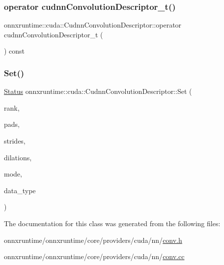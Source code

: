 \subsubsection{\texorpdfstring{operator cudnn\+Convolution\+Descriptor\+\_\+t()}{operator cudnnConvolutionDescriptor\_t()}}
{\footnotesize\ttfamily onnxruntime\+::cuda\+::\+Cudnn\+Convolution\+Descriptor\+::operator cudnn\+Convolution\+Descriptor\+\_\+t (\begin{DoxyParamCaption}{ }\end{DoxyParamCaption}) const\hspace{0.3cm}{\ttfamily [inline]}}

\mbox{\label{classonnxruntime_1_1cuda_1_1CudnnConvolutionDescriptor_a333c30a9ab08ede4bc35a23dce3a0365}} 
\subsubsection{\texorpdfstring{Set()}{Set()}}
{\footnotesize\ttfamily \mbox{\hyperlink{classonnxruntime_1_1common_1_1Status}{Status}} onnxruntime\+::cuda\+::\+Cudnn\+Convolution\+Descriptor\+::\+Set (\begin{DoxyParamCaption}\item[{\mbox{\hyperlink{mlasi_8h_a503efbc1c6e50825320ad909366b78ab}{size\+\_\+t}}}]{rank,  }\item[{const std\+::vector$<$ int64\+\_\+t $>$ \&}]{pads,  }\item[{const std\+::vector$<$ int64\+\_\+t $>$ \&}]{strides,  }\item[{const std\+::vector$<$ int64\+\_\+t $>$ \&}]{dilations,  }\item[{cudnn\+Convolution\+Mode\+\_\+t}]{mode,  }\item[{cudnn\+Data\+Type\+\_\+t}]{data\+\_\+type }\end{DoxyParamCaption})}



The documentation for this class was generated from the following files\+:\begin{DoxyCompactItemize}
\item 
onnxruntime/onnxruntime/core/providers/cuda/nn/\mbox{\hyperlink{cuda_2nn_2conv_8h}{conv.\+h}}\item 
onnxruntime/onnxruntime/core/providers/cuda/nn/\mbox{\hyperlink{cuda_2nn_2conv_8cc}{conv.\+cc}}\end{DoxyCompactItemize}

